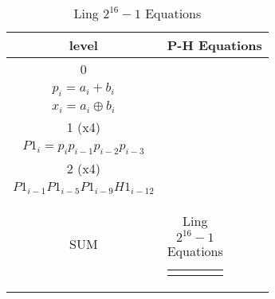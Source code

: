 \begin{table}[H]
\centering
     \begin{tabularx}{\textwidth}{ || c | X || } 

        \hline
        level & P-H Equations\\
        \hline
        \hline
        
        0   & 
        \begin{tabular}{@{}c@{}}
        $g_i = a_i * b_i$\\
        $p_i = a_i + b_i$\\
        $x_i = a_i \oplus b_i $
        \end{tabular}\\\hline

        
        1 (x4)  & 
        \begin{tabular}{@{}c@{}}
        $H1_i = g_i + g_{i-1} + p_{i-1}g_{i-2} + p_{i-1}p_{i-2}g_{i-3} $\\
        $P1_i = p_ip_{i-1}p_{i-2}p_{i-3}$
        \end{tabular}\\\hline

        2 (x4)  & 
        \begin{tabular}{@{}c@{}}
        $H2_i = H1_i + P1_{i-1}H1_{i-4} + P1_{i-1}P1_{i-5}H1_{i-8} +$ \\ $P1_{i-1}P1_{i-5}P1_{i-9}H1_{i-12}$
        \end{tabular}\\\hline


        SUM   & 
        \begin{tabular}{@{}c@{}}
        $ sum_i = H2_{i-1}\ ?\ (x_i \oplus p_{i-1})\ :\ x_i$
        \end{tabular}\\\hline

    \end{tabularx}
\caption{Ling $2^{16}-1$ Equations}
\end{table}




